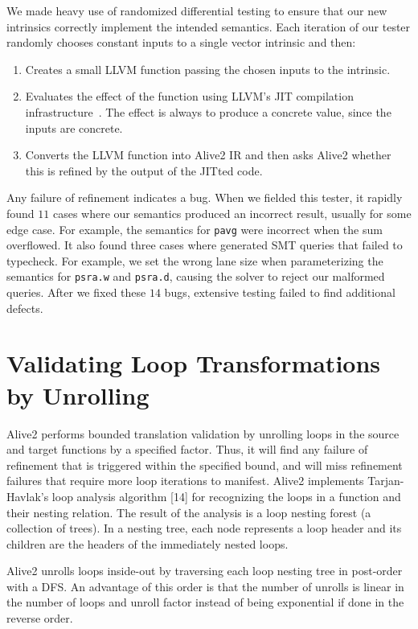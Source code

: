 We made heavy use of randomized differential testing to ensure that
our new intrinsics correctly implement the intended semantics.
%
Each iteration of our tester randomly chooses constant inputs to a
single vector intrinsic and then:
%
\begin{enumerate}
\item
  Creates a small LLVM function passing the chosen inputs to the
  intrinsic.
\item
  Evaluates the effect of the function using LLVM's JIT compilation
  infrastructure~\cite{orc}. The effect is always to produce a
  concrete value, since the inputs are concrete.
\item
  Converts the LLVM function into Alive2 IR and then asks Alive2
  whether this is refined by the output of the JITted code.
\end{enumerate}
%
Any failure of refinement indicates a bug.
%
When we fielded this tester, it rapidly found $11$ cases
where our semantics produced an incorrect result, usually for
some edge case.
%
For example, the semantics for \texttt{pavg} were incorrect when the
sum overflowed.
%
It also found three cases where \minotaur{} generated SMT queries that
failed to typecheck.
%
For example, we set the wrong lane size when parameterizing the
semantics for \texttt{psra.w} and \texttt{psra.d}, causing the solver
to reject our malformed queries.
%
After we fixed these $14$ bugs, extensive testing failed to find
additional defects.

\section {Validating Loop Transformations by Unrolling}

Alive2 performs bounded translation validation by unrolling loops in
the source and target functions by a specified factor. Thus, it will
find any failure of refinement that is triggered within the specified
bound, and will miss refinement failures that require more loop
iterations to manifest. Alive2 implements Tarjan-Havlak’s loop
analysis algorithm [14] for recognizing the loops in a function and
their nesting relation. The result of the analysis is a loop nesting
forest (a collection of trees). In a nesting tree, each node
represents a loop header and its children are the headers of the
immediately nested loops.

Alive2 unrolls loops inside-out by traversing each loop nesting tree
in post-order with a DFS. An advantage of this order is that the
number of unrolls is linear in the number of loops and unroll factor
instead of being exponential if done in the reverse order.


